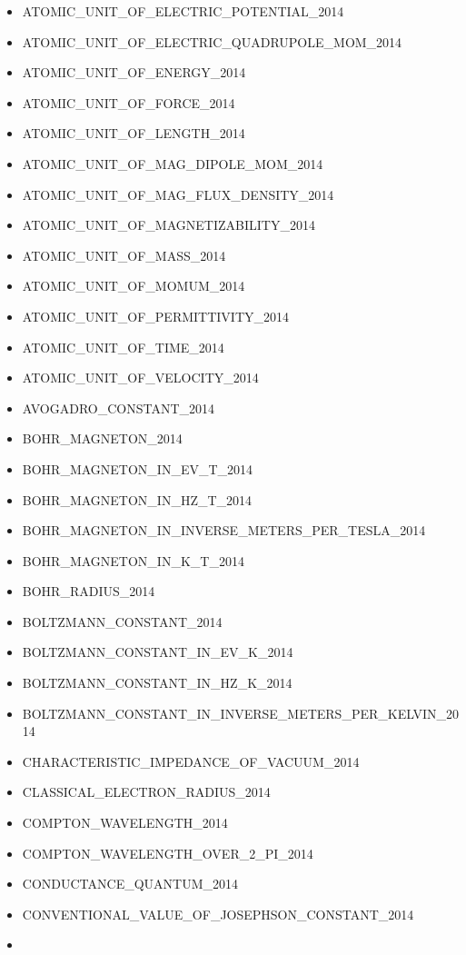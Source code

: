 \begin{itemize}
  ATOMIC\_UNIT\_OF\_ELECTRIC\_POLARIZABILITY\_2014
\item
  ATOMIC\_UNIT\_OF\_ELECTRIC\_POTENTIAL\_2014
\item
  ATOMIC\_UNIT\_OF\_ELECTRIC\_QUADRUPOLE\_MOM\_2014
\item
  ATOMIC\_UNIT\_OF\_ENERGY\_2014
\item
  ATOMIC\_UNIT\_OF\_FORCE\_2014
\item
  ATOMIC\_UNIT\_OF\_LENGTH\_2014
\item
  ATOMIC\_UNIT\_OF\_MAG\_DIPOLE\_MOM\_2014
\item
  ATOMIC\_UNIT\_OF\_MAG\_FLUX\_DENSITY\_2014
\item
  ATOMIC\_UNIT\_OF\_MAGNETIZABILITY\_2014
\item
  ATOMIC\_UNIT\_OF\_MASS\_2014
\item
  ATOMIC\_UNIT\_OF\_MOMUM\_2014
\item
  ATOMIC\_UNIT\_OF\_PERMITTIVITY\_2014
\item
  ATOMIC\_UNIT\_OF\_TIME\_2014
\item
  ATOMIC\_UNIT\_OF\_VELOCITY\_2014
\item
  AVOGADRO\_CONSTANT\_2014
\item
  BOHR\_MAGNETON\_2014
\item
  BOHR\_MAGNETON\_IN\_EV\_T\_2014
\item
  BOHR\_MAGNETON\_IN\_HZ\_T\_2014
\item
  BOHR\_MAGNETON\_IN\_INVERSE\_METERS\_PER\_TESLA\_2014
\item
  BOHR\_MAGNETON\_IN\_K\_T\_2014
\item
  BOHR\_RADIUS\_2014
\item
  BOLTZMANN\_CONSTANT\_2014
\item
  BOLTZMANN\_CONSTANT\_IN\_EV\_K\_2014
\item
  BOLTZMANN\_CONSTANT\_IN\_HZ\_K\_2014
\item
  BOLTZMANN\_CONSTANT\_IN\_INVERSE\_METERS\_PER\_KELVIN\_2014
\item
  CHARACTERISTIC\_IMPEDANCE\_OF\_VACUUM\_2014
\item
  CLASSICAL\_ELECTRON\_RADIUS\_2014
\item
  COMPTON\_WAVELENGTH\_2014
\item
  COMPTON\_WAVELENGTH\_OVER\_2\_PI\_2014
\item
  CONDUCTANCE\_QUANTUM\_2014
\item
  CONVENTIONAL\_VALUE\_OF\_JOSEPHSON\_CONSTANT\_2014
\item

\end{itemize}
